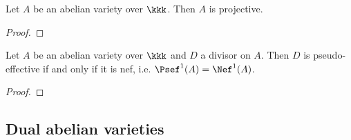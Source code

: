     \begin{theorem}\label{thm: abelian varieties are projective}
        Let $A$ be an abelian variety over $\kkk$. 
        Then $A$ is projective.
    \end{theorem}
    \begin{proof}
    \end{proof}

    \begin{corollary}\label{cor:psef_iff_nef_for_abelian_varieties}
        Let \(A\) be an abelian variety over \(\kkk\) and \(D\) a divisor on \(A\).
        Then \(D\) is pseudo-effective if and only if it is nef, i.e. \(\Psef^1(A) = \Nef^1(A)\).
    \end{corollary}
    \begin{proof}
    \end{proof}






\subsection{Dual abelian varieties}

